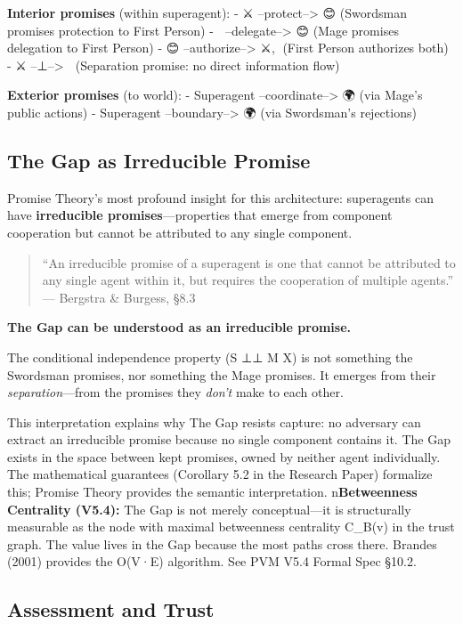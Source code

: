 \documentclass[
]{article}
\begin{document}
\textbf{Interior promises} (within superagent): - ⚔️
--protect--\textgreater{} 😊 (Swordsman promises protection to First
Person) - 🧙 --delegate--\textgreater{} 😊 (Mage promises delegation to
First Person) - 😊 --authorize--\textgreater{} ⚔️,🧙 (First Person
authorizes both) - ⚔️ --⊥--\textgreater{} 🧙 (Separation promise: no
direct information flow)

\textbf{Exterior promises} (to world): - Superagent
--coordinate--\textgreater{} 🌍 (via Mage's public actions) - Superagent
--boundary--\textgreater{} 🌍 (via Swordsman's rejections)

\subsection{The Gap as Irreducible
Promise}\label{the-gap-as-irreducible-promise}

Promise Theory's most profound insight for this architecture:
superagents can have \textbf{irreducible promises}---properties that
emerge from component cooperation but cannot be attributed to any single
component.

\begin{quote}
``An irreducible promise of a superagent is one that cannot be
attributed to any single agent within it, but requires the cooperation
of multiple agents.'' --- Bergstra \& Burgess, §8.3
\end{quote}

\textbf{The Gap can be understood as an irreducible promise.}

The conditional independence property (S ⊥⊥ M \textbar{} X) is not
something the Swordsman promises, nor something the Mage promises. It
emerges from their \emph{separation}---from the promises they
\emph{don't} make to each other.

This interpretation explains why The Gap resists capture: no adversary
can extract an irreducible promise because no single component contains
it. The Gap exists in the space between kept promises, owned by neither
agent individually. The mathematical guarantees (Corollary 5.2 in the
Research Paper) formalize this; Promise Theory provides the semantic
interpretation. n\textbf{Betweenness Centrality (V5.4):} The Gap is not
merely conceptual---it is structurally measurable as the node with
maximal betweenness centrality C\_B(v) in the trust graph. The value
lives in the Gap because the most paths cross there. Brandes (2001)
provides the O(V·E) algorithm. See PVM V5.4 Formal Spec §10.2.

\subsection{Assessment and Trust}\label{assessment-and-trust}
\end{document}
